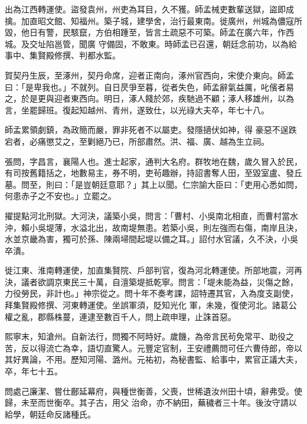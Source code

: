 \begin{pinyinscope}
 出為江西轉運使。盜發袁州，州吏為耳目，久不獲。師孟械吏數輩送獄，盜即成擒。加直昭文館、知福州。築子城，建學舍，治行最東南。徙廣州，州城為儂寇所毀，他日有警，民駭竄，方伯相踵至，皆言土疏惡不可築。師孟在廣六年，作西城。及交址陷邕管，聞廣
 守備固，不敢東。時師孟已召還，朝廷念前功，以為給事中、集賢殿修撰、判都水監。



 賀契丹生辰，至涿州，契丹命席，迎者正南向，涿州官西向，宋使介東向。師孟曰：「是卑我也。」不就列。自日昃爭至暮，從者失色，師孟辭氣益厲，叱儐者易之，於是更與迎者東西向。明日，涿人餞於郊，疾馳過不顧；涿人移雄州，以為言，坐罷歸班。復起知越州、青州，遂致仕，以光祿大夫卒，年七十八。



 師孟累領劇鎮，為政簡而嚴，罪非死者不以屬吏。發隱擿伏如神，得
 豪惡不逞跌宕者，必痛懲艾之，至剿絕乃已，所部肅然。洪、福、廣、越為生立祠。



 張問，字昌言，襄陽人也。進士起家，通判大名府。群牧地在魏，歲久冒入於民，有司按舊籍括之，地數易主，券不明，吏茍趣辦，持詔書奪人田，至毀室盧、發丘墓。問至，則曰：「是豈朝廷意耶？」其上以聞。仁宗諭大臣曰：「吏用心悉如問，何患赤子之不安也。」立罷之。



 擢提點河北刑獄。大河決，議築小吳，問言：「曹村、小吳南北相直，而曹村當水
 沖，賴小吳堤薄，水溢北出，故南堤無患。若築小吳，則左強而右傷，南岸且決，水並京畿為害，獨可於孫、陳兩埽間起堤以備之耳。」詔付水官議，久不決，小吳卒潰。



 徙江東、淮南轉運使，加直集賢院、戶部判官，復為河北轉運使。所部地震，河再決，議者欲調京東民三十萬，自澶築堤抵乾寧。問言：「堤未能為益，災傷之餘，力役勞民，非計也。」神宗從之。問十年不奏考課，詔特遷其官，入為度支副使，拜集賢殿修撰、河東轉運使。坐誤軍須，貶知光化
 軍，未幾，復使河北。諸葛公權之亂，郡縣株蔓，連逮至數百千人，問上疏申理，止誅首惡。



 熙寧末，知滄州。自新法行，問獨不阿時好。歲饑，為帝言民茍免常平、助役之苦，反以得流亡為幸，語切直驚人。元豐定官制，王安禮薦問可任六曹侍郎，帝以其好異論，不用。歷知河陽、潞州。元祐初，為秘書監、給事中，累官正議大夫，卒，年七十五。



 問處己廉潔、嘗仕鄜延幕府，與種世衡善，父喪，世稀遺汝州田十頃，辭弗受。使歸，未至而世衡卒。其子古，用父
 治命，亦不納田，蕪穢者三十年。後汝守請以給學，朝廷命反諸種氏。




\end{pinyinscope}
